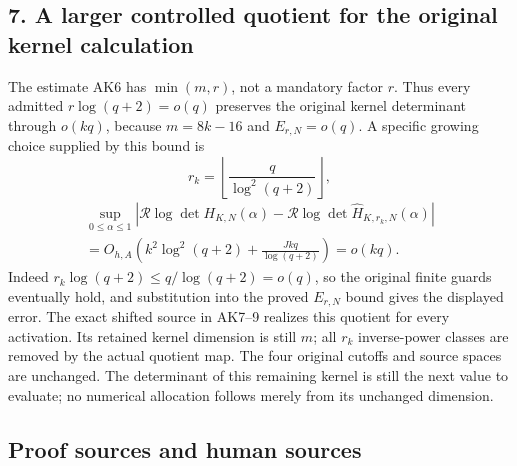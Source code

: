 \documentclass[11pt]{article}
\begin{document}
\subsection{7. A larger controlled quotient for the original kernel calculation}\label{a-larger-controlled-quotient-for-the-original-kernel-calculation}

The estimate AK6 has \(\min(m,r)\), not a mandatory factor \(r\). Thus every admitted \(r\log(q+2)=o(q)\) preserves the original kernel determinant through \(o(kq)\), because \(m=8k-16\) and \(E_{r,N}=o(q)\). A specific growing choice supplied by this bound is \[
r_k=\left\lfloor\frac{q}{\log^2(q+2)}\right\rfloor,
\] \[
\begin{gathered}
\sup_{0\le\alpha\le1}
\left|\mathcal R\log\det H_{K,N}(\alpha)
-\mathcal R\log\det\widehat H_{K,r_k,N}(\alpha)\right|\\
=O_{h,A}\!\left(k^2\log^2(q+2)+\frac{Jkq}{\log(q+2)}\right)=o(kq).
\end{gathered}
\tag{AK20}
\] Indeed \(r_k\log(q+2)\le q/\log(q+2)=o(q)\), so the original finite guards eventually hold, and substitution into the proved \(E_{r,N}\) bound gives the displayed error. The exact shifted source in AK7--9 realizes this quotient for every activation. Its retained kernel dimension is still \(m\); all \(r_k\) inverse-power classes are removed by the actual quotient map. The four original cutoffs and source spaces are unchanged. The determinant of this remaining kernel is still the next value to evaluate; no numerical allocation follows merely from its unchanged dimension.

\subsection{Proof sources and human sources}\label{proof-sources-and-human-sources}
\end{document}

